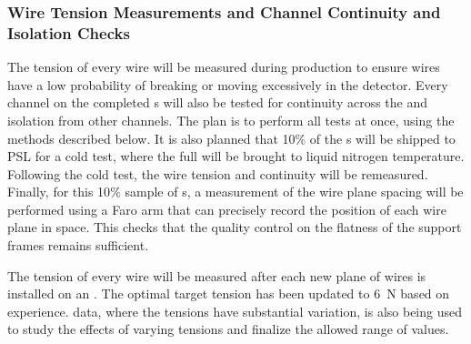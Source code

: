 \subsubsection{Wire Tension Measurements and Channel Continuity and Isolation Checks}
\label{sec:fdsp-apa-prod-qa-tension}

The tension of every wire will be measured during production to ensure wires have a low probability of breaking or moving excessively in the detector.  Every channel on the completed s will also be tested for continuity across the  and isolation from other channels.  The plan is to perform all tests at once, using the methods described below. It is also planned that 10$\%$ of the s will be shipped to PSL for a cold test, where the full  will be brought to liquid nitrogen temperature. Following the cold test, the wire tension and continuity will be remeasured.  Finally, for this 10$\%$ sample of s, a measurement of the wire plane spacing will be performed using a Faro arm that can precisely record the position of each wire plane in space. This checks that the quality control on the flatness of the support frames remains sufficient.  

The tension of every wire will be measured after each new plane of wires is installed on an . The optimal target tension has been updated to \SI{6}{N} based on  experience.   data, where the tensions have substantial variation, is also being used to study the effects of varying tensions and finalize the allowed range of values.  

